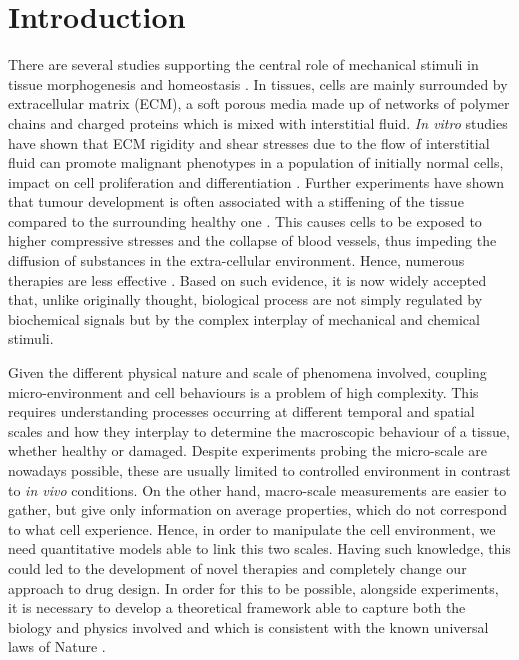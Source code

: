 \section{Introduction}

There are several studies supporting the central role of mechanical stimuli in tissue morphogenesis and homeostasis \cite{ex1,ex2}. In tissues, cells are mainly surrounded by extracellular matrix (ECM), a soft porous media made up of networks of polymer chains and charged proteins which is mixed with interstitial fluid. \textit{In vitro} studies have shown that ECM rigidity and shear stresses due to the flow of interstitial fluid can promote malignant phenotypes in a population of initially normal cells, impact on cell proliferation and differentiation \cite{ex3}. Further experiments have shown that tumour development is often associated with a stiffening of the tissue compared to the surrounding healthy one \cite{ex4}. This causes cells to be exposed to higher compressive stresses and the collapse of blood vessels, thus impeding the diffusion of substances in the extra-cellular environment. Hence, numerous therapies are less effective \cite{ecm2}. Based on such evidence, it is now widely accepted that, unlike originally thought, biological process are not simply regulated by biochemical signals but by the complex interplay of mechanical and chemical stimuli.
 
Given the different physical nature and scale of phenomena involved, coupling micro-environment and cell behaviours is a problem of high complexity. This requires understanding processes occurring at different temporal and spatial scales and how they interplay to determine the macroscopic behaviour of a tissue, whether healthy or damaged. Despite experiments probing the micro-scale are nowadays possible, these are usually limited to controlled environment in contrast to \textit{in vivo} conditions. On the other hand, macro-scale measurements are easier to gather, but give only information on average properties, which do not correspond to what cell experience. Hence, in order to manipulate the cell environment, we need quantitative models able to link this two scales. Having such knowledge, this could led to the development of novel therapies and completely change our approach to  drug design. In order for this to be possible, alongside experiments, it is necessary to develop a theoretical framework able to capture both the biology and physics involved and which is consistent with the known universal laws of Nature \cite{NET}. 

